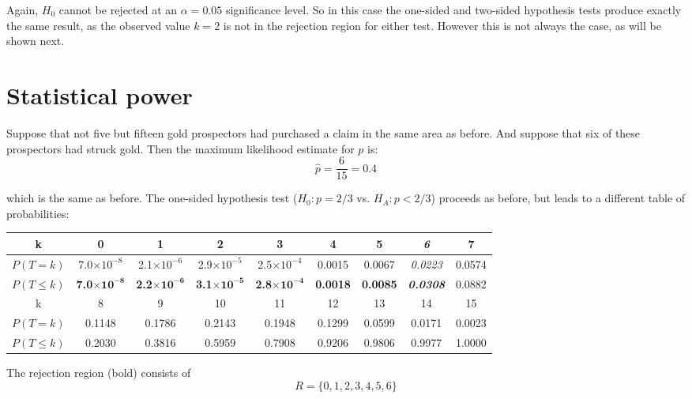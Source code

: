 Again, $H_0$ cannot be rejected at an $\alpha=0.05$ significance
level.  So in this case the one-sided and two-sided hypothesis tests
produce exactly the same result, as the observed value $k=2$ is not in
the rejection region for either test. However this is not always the
case, as will be shown next.

\section{Statistical power}
\label{sec:power}

Suppose that not five but fifteen gold prospectors had purchased a
claim in the same area as before. And suppose that six of these
prospectors had struck gold. Then the maximum likelihood estimate for
$p$ is:
\[
\hat{p} = \frac{6}{15} = 0.4
\]

\noindent which is the same as before. The one-sided hypothesis test
($H_0: p={2/3}$ vs. $H_{\!A}: p<2/3$) proceeds as before, but leads to
a different table of probabilities:

\begin{center}
  \begin{tabular}{c@{\gap}c@{\gap}c@{\gap}c@{\gap}c@{\gap}c@{\gap}c@{\gap}c@{\gap}c}
    k & \textbf{0} & \textbf{1} & \textbf{2} & \textbf{3} & \textbf{4}
    & \textbf{5} & \textbf{\textit{6}} & 7 \\ \hline $P(T=k)$ &
    7.0$\times{10}^{-8}$ & 2.1$\times{10}^{-6}$ & 2.9$\times{10}^{-5}$
    & 2.5$\times{10}^{-4}$ & 0.0015 & 0.0067 & \textit{0.0223} & 0.0574 \\
    $P({T}\leq{k})$ & \textbf{7.0}$\mathbf{\times{10}^{-8}}$
    & \textbf{2.2}$\mathbf{\times{10}^{-6}}$ &
    \textbf{3.1}$\mathbf{\times{10}^{-5}}$ &
    \textbf{2.8}$\mathbf{\times{10}^{-4}}$ & \textbf{0.0018} &
    \textbf{0.0085} & \textbf{\textit{0.0308}} & 0.0882 \\
    k & 8 & 9 & 10 & 11 & 12 & 13 & 14 & 15 \\
    \hline $P(T=k)$ & 0.1148 & 0.1786 & 0.2143
    & 0.1948 & 0.1299 & 0.0599 & 0.0171 & 0.0023 \\
    $P({T}\leq{k})$ & 0.2030 & 0.3816 & 0.5959 & 0.7908 &
    0.9206 & 0.9806 & 0.9977 & 1.0000
  \end{tabular}
\end{center}

The rejection region (bold) consists of
\begin{equation}
  R=\{0,1,2,3,4,5,6\}
  \label{eq:1sidedbinomtest15}
\end{equation}


